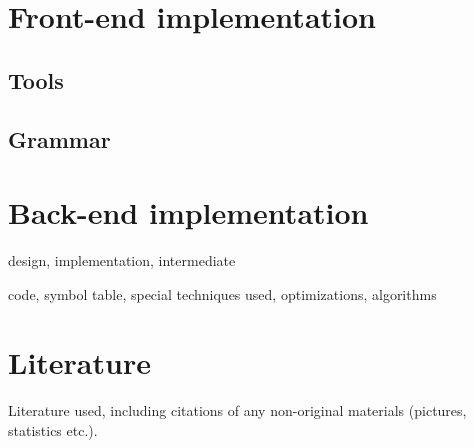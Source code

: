 
\section{Front-end implementation}

\subsection{Tools}

\subsection{Grammar}


\section{Back-end implementation}
design, implementation, intermediate

code, symbol table, special techniques used, optimizations, algorithms

\section{Literature}
Literature used, including citations of any non-original materials (pictures, statistics
etc.).